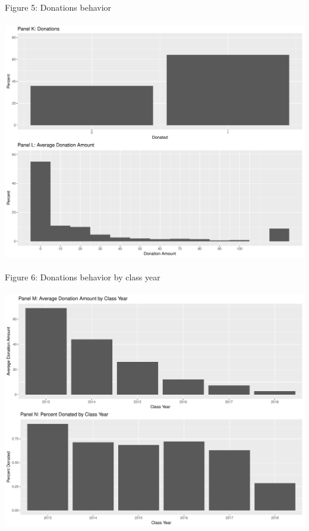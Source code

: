 \documentclass[12pt]{article}
\begin{document}
\noindent Figure 5: Donations behavior\\ \\
\includegraphics[scale=0.4]{Figure4.pdf}\\ \\

\noindent Figure 6: Donations behavior by class year\\ \\
\includegraphics[scale=0.4]{Figure6.pdf}
\end{document}
